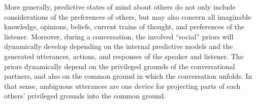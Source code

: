 \documentclass[10pt,a4paper]{article}
\begin{document}
More generally, predictive states of mind about others do not only include considerations of the preferences of others, but may also concern all imaginable knowledge, opinions, beliefs, current trains of thought, and preferences of the listener.
Moreover, during a conversation, the involved ``social'' priors will dynamically develop depending on the internal predictive models and the generated utterances, actions, and responses of the speaker and listener. 
The priors dynamically depend on the privileged grounds of the conversational partners, and also on the common ground in which the conversation unfolds.
In that sense, ambiguous utterances are one device for projecting parts of each others' privileged grounds into the common ground. 




\setlength{\bibleftmargin}{.125in}
\setlength{\bibindent}{-\bibleftmargin}


\end{document}
